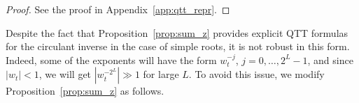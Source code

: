 \documentclass[a4paper]{article}
\newcommand{\LL}{L}
\begin{document}
\begin{proof}
	    See the proof in Appendix~\ref{app:qtt_repr}.
	\end{proof}




Despite the fact that Proposition~\ref{prop:sum_z} provides explicit QTT formulas for the circulant inverse in the case of simple roots, it is not robust in this form.
Indeed, some of the exponents will have the form $w_t^{-j}$, $j=0,\dots,2^{\LL}-1$, and since $|w_{t}|<1$, we will get $|w_t^{-2^{\LL}}| \gg 1$ for large $\LL$.
To avoid this issue, we modify Proposition~\ref{prop:sum_z} as follows. 
\end{document}
